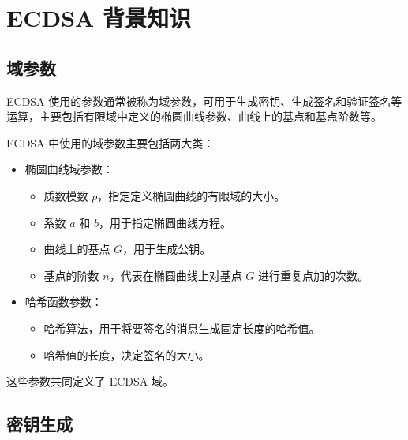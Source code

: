 \documentclass[main\_\_CN.tex]{subfiles}
\begin{document}

\label{sec:ecdsa-terminology}

\section{ECDSA 背景知识}
\subsection{域参数}

ECDSA 使用的参数通常被称为域参数，可用于生成密钥、生成签名和验证签名等运算，主要包括有限域中定义的椭圆曲线参数、曲线上的基点和基点阶数等。

ECDSA 中使用的域参数主要包括两大类：

\begin{itemize}
    \item 椭圆曲线域参数：
          \begin{itemize}
              \item 质数模数 $p$，指定定义椭圆曲线的有限域的大小。
              \item 系数 $a$ 和 $b$，用于指定椭圆曲线方程。
              \item 曲线上的基点 $G$，用于生成公钥。
              \item 基点的阶数 $n$，代表在椭圆曲线上对基点 $G$ 进行重复点加的次数。
          \end{itemize}
    \item 哈希函数参数：
          \begin{itemize}
              \item 哈希算法，用于将要签名的消息生成固定长度的哈希值。
              \item 哈希值的长度，决定签名的大小。
          \end{itemize}
\end{itemize}

这些参数共同定义了 ECDSA 域。

\subsection{密钥生成}
\end{document}
